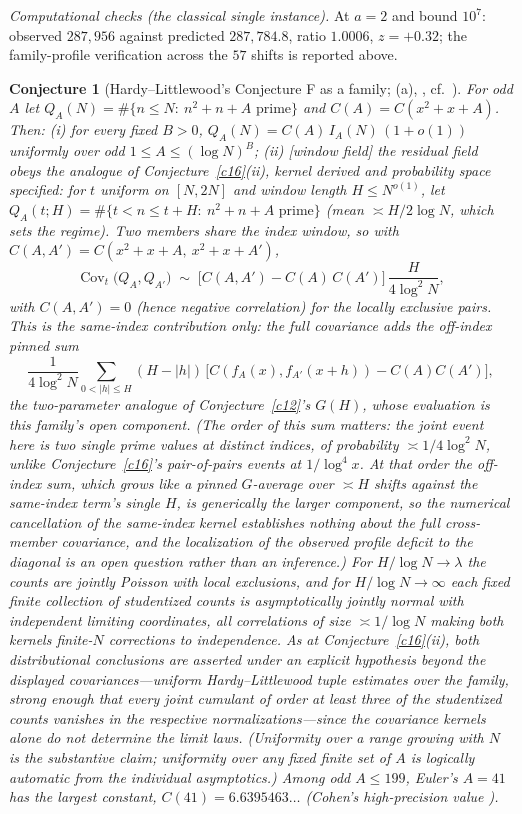 \documentclass[11pt]{article}
\newtheorem{conjecture}{Conjecture}
\theoremstyle{definition}
\begin{document}
\emph{Computational checks (the classical single instance).}  At $a=2$ and
bound $10^{7}$: observed $287{,}956$ against predicted $287{,}784.8$,
ratio $1.0006$, $z=+0.32$; the family-profile verification across the
$57$ shifts is reported above.

\setcounter{conjecture}{15}%
\begin{conjecture}[Hardy--Littlewood's Conjecture F as a family; (a), \cite{HL1923},
cf.~\cite{JW}]\label{c24}
For odd $A$ let $Q_A(N)=\#\{n\le N:\ n^2+n+A \text{ prime}\}$ and
$C(A)=C(x^2+x+A)$.  Then: \emph{(i)} for every fixed $B>0$, $Q_A(N)=C(A)\,I_A(N)\,(1+o(1))$ uniformly over odd $1\le A\le(\log N)^B$; \emph{(ii)} [window field] the residual field obeys the analogue of Conjecture~\ref{c16}(ii), kernel derived and probability space specified: for $t$ uniform on $[N,2N]$ and window length $H\le
N^{o(1)}$, let
$Q_A(t;H)=\#\{t<n\le t+H:\ n^2+n+A \text{ prime}\}$ (mean
${\asymp}H/2\log N$, which sets the regime).  Two members share the
index window, so with $C(A,A')=C(x^2+x+A,\ x^2+x+A')$,
\[
\operatorname{Cov}_t\bigl(Q_A,Q_{A'}\bigr)\;\sim\;
\bigl[C(A,A')-C(A)\,C(A')\bigr]\,\frac{H}{4\log^2N},
\]
with $C(A,A')=0$ (hence \emph{negative} correlation) for the locally
exclusive pairs.  This is the \emph{same-index} contribution only: the full
covariance adds the off-index pinned sum
\[
\frac1{4\log^2N}\sum_{0<|h|\le H}(H-|h|)\,
\bigl[C(f_A(x),f_{A'}(x+h))-C(A)C(A')\bigr],
\]
the two-parameter analogue of
Conjecture~\ref{c12}'s $G(H)$, whose evaluation is this family's
open component.  (The order of this sum matters: the joint event here is
\emph{two single prime values} at
distinct indices, of probability $\asymp1/4\log^2N$, unlike
Conjecture~\ref{c16}'s pair-of-pairs events at $1/\log^4x$.  At that
order the off-index sum, which grows like a pinned
$G$-average over $\asymp H$ shifts against the same-index term's
single $H$, is generically the \emph{larger} component, so the
numerical cancellation of the same-index kernel establishes nothing
about the full cross-member covariance, and the localization of the
observed profile deficit to the diagonal is an open question rather
than an inference.)  For $H/\log N\to\lambda$ the counts are jointly
Poisson with local exclusions, and for $H/\log N\to\infty$ each
fixed finite collection of studentized counts is asymptotically
jointly normal with independent limiting coordinates, all
correlations of size $\asymp1/\log N$ making
both kernels finite-$N$ corrections to independence.  As at
Conjecture~\ref{c16}(ii), both distributional conclusions are
asserted under an explicit hypothesis beyond the displayed
covariances---uniform Hardy--Littlewood tuple estimates over the
family, strong enough that every joint cumulant of order at least
three of the studentized counts vanishes in the respective
normalizations---since the covariance kernels alone do not
determine the limit laws.
(Uniformity over a range growing with $N$ is the substantive claim;
uniformity over any \emph{fixed} finite set of $A$ is logically
automatic from the individual asymptotics.)  Among
odd $A\le199$, Euler's $A=41$ has the largest constant,
$C(41)=6.6395463\ldots$ (Cohen's high-precision value \cite{Cohen}).
\end{conjecture}
\end{document}
